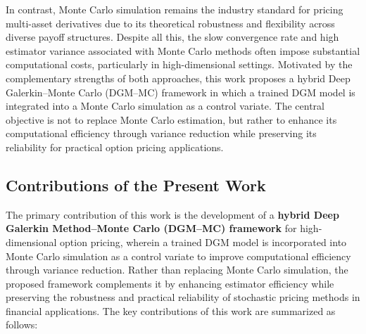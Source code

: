 \documentclass[12pt, a4paper]{article}
\begin{document}
In contrast, Monte Carlo simulation remains the industry standard for
pricing multi-asset derivatives due to its theoretical robustness and
flexibility across diverse payoff structures. Despite all this, the
slow convergence rate and high estimator variance associated with
Monte Carlo methods often impose substantial computational costs,
particularly in high-dimensional settings. Motivated by the
complementary strengths of both approaches, this work proposes a
hybrid Deep Galerkin--Monte Carlo (DGM--MC) framework in which a
trained DGM model is integrated into a Monte Carlo simulation as a
control variate. The central objective is not to replace Monte Carlo
estimation, but rather to enhance its computational efficiency through
variance reduction while preserving its reliability for practical
option pricing applications.

\subsection{Contributions of the Present Work}

The primary contribution of this work is the development of a
\textbf{hybrid Deep Galerkin Method--Monte Carlo (DGM--MC) framework}
for high-dimensional option pricing, wherein a trained DGM model is
incorporated into Monte Carlo simulation as a control variate to
improve computational efficiency through variance reduction. Rather
than replacing Monte Carlo simulation, the proposed framework
complements it by enhancing estimator efficiency while preserving the
robustness and practical reliability of stochastic pricing methods in
financial applications. The key contributions of this work are
summarized as follows:
\end{document}
